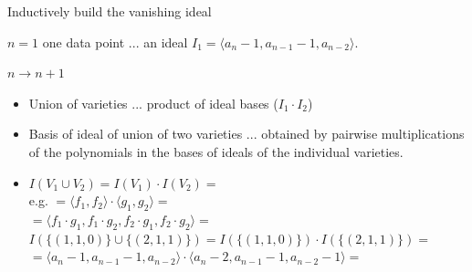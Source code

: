 \documentclass[t,usenames,dvipsnames]{beamer} %
\newcommand{\1}{\boldsymbol{1}}
\newcommand{\0}{\boldsymbol{0}}
\begin{document}
\begin{frame}{Inductively build the vanishing ideal}

    \begin{block}{$n=1$}
        one data point ... an ideal $I_1 = \langle a_n - 1, a_{n-1} - 1, a_{n-2} \rangle$.
    \end{block}

    \begin{block}{$n \to n+1$}

        \begin{itemize}
            \item Union of varieties ... product of ideal bases ($I_1 \cdot I_2$) \\

        \pause

        \item
        Basis of ideal of union of two varieties ... obtained by pairwise multiplications of the polynomials in the bases of ideals of the individual varieties. 
        \pause

        \item
            $ I( V_1 \cup V_2 ) = I(V_1) \cdot I(V_2) = $ \\ \pause
            e.g. $  = \langle f_1, f_2 \rangle \cdot \langle g_1, g_2 \rangle = $ \\ \pause
            $  = \langle f_1\cdot g_1, f_1\cdot g_2, f_2\cdot g_1, f_2\cdot g_2 \rangle = $ \\ \pause
                $I(\{(1,1,0)\} \cup \{(2,1,1)\}) = I(\{(1,1,0)\}) \cdot I(\{(2,1,1)\}) = $ \\ \pause
               $ = \langle a_n - 1, a_{n-1} - 1, a_{n-2} \rangle \cdot \langle a_n - 2, a_{n-1} - 1, a_{n-2}-1 \rangle = $ 


        \end{itemize}


    \end{block}


\end{frame}
\end{document}
